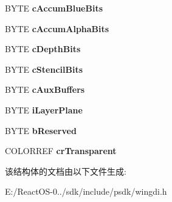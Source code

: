 \begin{DoxyCompactItemize}
\mbox{\label{structtag_l_a_y_e_r_p_l_a_n_e_d_e_s_c_r_i_p_t_o_r_ae6debb8235ba5a71e4c0dfac90b4a90b}} 
B\+Y\+TE {\bfseries c\+Accum\+Blue\+Bits}
\item 
\mbox{\label{structtag_l_a_y_e_r_p_l_a_n_e_d_e_s_c_r_i_p_t_o_r_a0105b81460d90bd921ad04bab8335555}} 
B\+Y\+TE {\bfseries c\+Accum\+Alpha\+Bits}
\item 
\mbox{\label{structtag_l_a_y_e_r_p_l_a_n_e_d_e_s_c_r_i_p_t_o_r_a18264ed5fb6ce944b8bcbb9585066c3f}} 
B\+Y\+TE {\bfseries c\+Depth\+Bits}
\item 
\mbox{\label{structtag_l_a_y_e_r_p_l_a_n_e_d_e_s_c_r_i_p_t_o_r_a1c63a1ad07f1a81c77d6a2801f1cdf92}} 
B\+Y\+TE {\bfseries c\+Stencil\+Bits}
\item 
\mbox{\label{structtag_l_a_y_e_r_p_l_a_n_e_d_e_s_c_r_i_p_t_o_r_a30ca0966b40504b6378af1663ee37f07}} 
B\+Y\+TE {\bfseries c\+Aux\+Buffers}
\item 
\mbox{\label{structtag_l_a_y_e_r_p_l_a_n_e_d_e_s_c_r_i_p_t_o_r_ad017ec2ed5722840e6fb524ba2cb0be8}} 
B\+Y\+TE {\bfseries i\+Layer\+Plane}
\item 
\mbox{\label{structtag_l_a_y_e_r_p_l_a_n_e_d_e_s_c_r_i_p_t_o_r_a28c1d6c334e81bea4d3625648e675d34}} 
B\+Y\+TE {\bfseries b\+Reserved}
\item 
\mbox{\label{structtag_l_a_y_e_r_p_l_a_n_e_d_e_s_c_r_i_p_t_o_r_a9a1f72ea198fb331bc62269e8f75f877}} 
C\+O\+L\+O\+R\+R\+EF {\bfseries cr\+Transparent}
\end{DoxyCompactItemize}


该结构体的文档由以下文件生成\+:\begin{DoxyCompactItemize}
\item 
E\+:/\+React\+O\+S-\/0../sdk/include/psdk/wingdi.\+h\end{DoxyCompactItemize}
